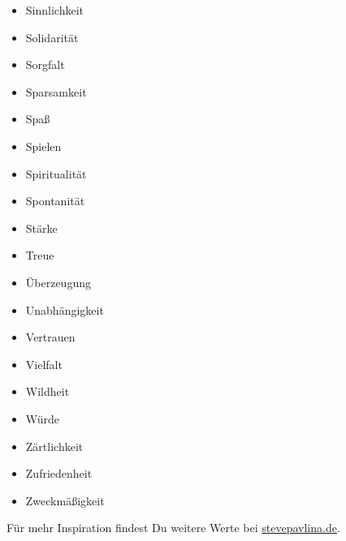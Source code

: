 \documentclass[../Lebensziel.tex]{subfiles}
\begin{document}
\begin{multicols}{3}
\begin{itemize}
        \item Sinnlichkeit
        \item Solidarität
        \item Sorgfalt
        \item Sparsamkeit
        \item Spaß
        \item Spielen
        \item Spiritualität
        \item Spontanität
        \item Stärke
        \item Treue
        \item Überzeugung
        \item Unabhängigkeit
        \item Vertrauen
        \item Vielfalt
        \item Wildheit
        \item Würde
        \item Zärtlichkeit
        \item Zufriedenheit
        \item Zweckmäßigkeit
    \end{itemize}
\end{multicols}

Für mehr Inspiration findest Du weitere Werte bei \href{https://stevepavlina.de/werte-liste/}{stevepavlina.de}.
\end{document}
